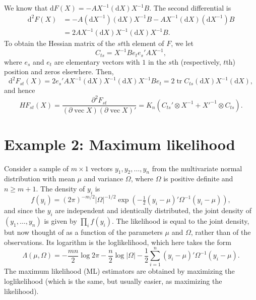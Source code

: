\documentclass[12pt,a4paper]{article}
\makeatletter
\theoremstyle{definition}
\renewenvironment{proof}[1][\proofname]{\par
  \pushQED{\qed}%
  \normalfont \topsep6\p@\@plus6\p@\relax
  \trivlist
  \item[\hskip\labelsep\bfseries #1\@addpunct{.}]\ignorespaces
}{%
  \popQED\endtrivlist\@endpefalse
}
\newenvironment{solution}{%
  \begin{proof}[Solution]%
}{%
  \end{proof}%
}
\DeclareMathOperator{\tr}{tr}
\DeclareMathOperator{\avec}{vec}
\newcommand{\dd}{\mathrm{d}}
\makeatother
\begin{document}
\begin{solution}
We know that $\dd F(X) = -AX^{-1}(\dd X)X^{-1}B$. The second differential is
\begin{align*}
\dd^2 F(X) &= -A(\dd X^{-1})(\dd X)X^{-1}B - AX^{-1}(\dd X)(\dd X^{-1})B \\
&= 2AX^{-1}(\dd X)X^{-1}(\dd X)X^{-1}B.
\end{align*}
To obtain the Hessian matrix of the $st$th element of $F$, we let
\[
C_{ts} = X^{-1}B e_t e_s' A X^{-1},
\]
where $e_s$ and $e_t$ are elementary vectors with $1$ in the $s$th (respectively, $t$th) position and zeros elsewhere. Then,
\[
\dd^2 F_{st}(X) = 2e_s' A X^{-1}(\dd X) X^{-1}(\dd X) X^{-1} B e_t = 2\tr C_{ts}(\dd X) X^{-1}(\dd X),
\]
and hence
\[
HF_{st}(X) = \frac{\partial^2 F_{st}}{(\partial \avec X)(\partial \avec X)'} = K_n(C_{ts}' \otimes X^{-1} + X'^{-1} \otimes C_{ts}).
\]
\end{solution}

\section{Example 2: Maximum likelihood}\label{sec:13}

Consider a sample of $m \times 1$ vectors $y_1, y_2, \dots, y_n$ from the multivariate normal distribution with mean $\mu$ and variance $\Omega$, where $\Omega$ is positive definite and $n \geqslant m + 1$. The density of $y_i$ is
\[
f(y_i) = (2\pi)^{-m/2} |\Omega|^{-1/2} \exp\left(-\tfrac{1}{2}(y_i - \mu)'\Omega^{-1}(y_i - \mu)\right),
\]
and since the $y_i$ are independent and identically distributed, the joint density of $(y_1, \dots, y_n)$ is given by $\prod_i f(y_i)$. The likelihood is equal to the joint density, but now thought of as a function of the parameters $\mu$ and $\Omega$, rather than of the observations. Its logarithm is the loglikelihood, which here takes the form
\begin{equation}\label{eq:43}
\Lambda(\mu, \Omega) = -\frac{mn}{2}\log 2\pi - \frac{n}{2}\log|\Omega|
- \frac{1}{2}\sum_{i=1}^{n}(y_i - \mu)'\Omega^{-1}(y_i - \mu).
\end{equation}
The maximum likelihood (ML) estimators are obtained by maximizing the loglikelihood (which is the same, but usually easier, as maximizing the likelihood). %
\end{document}
